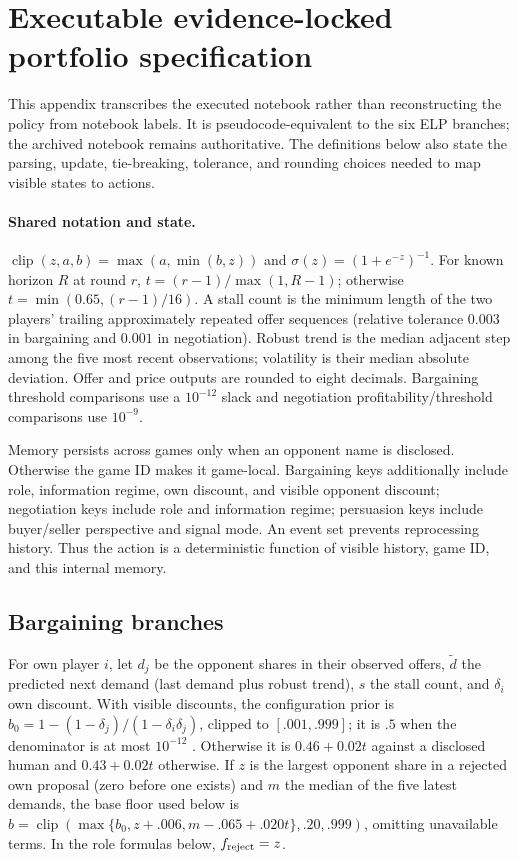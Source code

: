 \section{Executable evidence-locked portfolio specification}
\label{app:policy}

This appendix transcribes the executed notebook rather than reconstructing the
policy from notebook labels. It is pseudocode-equivalent to the six ELP branches;
the archived notebook remains authoritative. The definitions below also state
the parsing, update, tie-breaking, tolerance, and rounding choices needed to
map visible states to actions.

\paragraph{Shared notation and state.}
$\operatorname{clip}(z,a,b)=\max(a,\min(b,z))$ and
$\sigma(z)=(1+e^{-z})^{-1}$. For known horizon $R$ at round $r$,
$t=(r-1)/\max(1,R-1)$; otherwise $t=\min(0.65,(r-1)/16)$. A stall count is the
minimum length of the two players' trailing approximately repeated offer
sequences (relative tolerance $0.003$ in bargaining and $0.001$ in
negotiation). Robust trend is the median adjacent step among the five most
recent observations; volatility is their median absolute deviation.
Offer and price outputs are rounded to eight decimals. Bargaining threshold
comparisons use a $10^{-12}$ slack and negotiation profitability/threshold
comparisons use $10^{-9}$.

Memory persists across games only when an opponent name is disclosed. Otherwise
the game ID makes it game-local. Bargaining keys additionally include role,
information regime, own discount, and visible opponent discount; negotiation
keys include role and information regime; persuasion keys include buyer/seller
perspective and signal mode. An event set prevents reprocessing history. Thus
the action is a deterministic function of visible history, game ID, and this
internal memory.

\subsection{Bargaining branches}

For own player $i$, let $d_j$ be the opponent shares in their observed offers,
$\tilde d$ the predicted next demand (last demand plus robust trend), $s$ the
stall count, and $\delta_i$ own discount. With visible discounts, the
configuration prior is
$b_0=1-(1-\delta_j)/(1-\delta_i\delta_j)$, clipped to $[.001,.999]$; it is
$.5$ when the denominator is at most $10^{-12}$
\citep{rubinstein1982perfect}. Otherwise it is $0.46+0.02t$ against a disclosed human and
$0.43+0.02t$ otherwise. If $z$ is the largest opponent share in a rejected own
proposal (zero before one exists) and $m$ the median of the five latest demands,
the base floor used
below is $b=\operatorname{clip}(\max\{b_0,z+.006,m-.065+.020t\},.20,.999)$,
omitting unavailable terms. In the role formulas below,
$f_{\rm reject}=z$.

